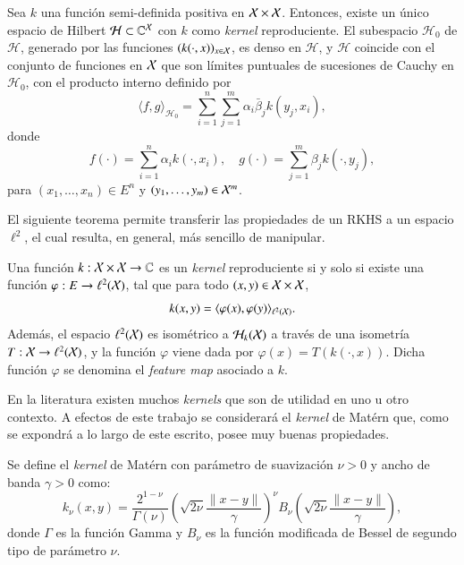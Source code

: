 \begin{teo}
Sea \( k \) una función semi-definida positiva en \( \mathcal{X} \times \mathcal{X} \). Entonces, existe un único espacio de Hilbert \( \mathcal{H} \subset \mathbb{C}^{\mathcal{X}} \) con \( k \) como \textit{kernel} reproduciente. El subespacio \( \mathcal{H}_0 \) de \( \mathcal{H} \), generado por las funciones \( (k(\cdot, x))_{x \in \mathcal{X}} \), es denso en \( \mathcal{H} \), y \( \mathcal{H} \) coincide con el conjunto de funciones en \( \mathcal{X} \) que son límites puntuales de sucesiones de Cauchy en \( \mathcal{H}_0 \), con el producto interno definido por
\[
\langle f, g \rangle_{\mathcal{H}_0} = \sum_{i=1}^n \sum_{j=1}^m \alpha_i \bar{\beta}_j k(y_j, x_i),
\]
donde
\[
f(\cdot) = \sum_{i=1}^n \alpha_i k(\cdot, x_i), \quad g(\cdot) = \sum_{j=1}^m \beta_j k(\cdot, y_j),
\]
para \( (x_1, \dots, x_n) \in E^n \) y \( (y_1, \dots, y_m) \in \mathcal{X}^m \).
\end{teo}

El siguiente teorema permite transferir las propiedades de un RKHS a un espacio \( \ell^2 \), el cual resulta, en general, más sencillo de manipular.

\begin{teo}
Una función \( k: \mathcal{X} \times \mathcal{X} \to \mathbb{C} \) es un \textit{kernel} reproduciente si y solo si existe una función \( \varphi: E \to \ell^2 (\mathcal{X}) \), tal que para todo \( (x, y) \in \mathcal{X} \times \mathcal{X} \),
\[
k(x, y)= \langle \varphi(x), \varphi(y) \rangle_{\ell^2(\mathcal{X})}.
\]
Además, el espacio \( \ell^2(\mathcal{X}) \) es isométrico a \( \mathcal{H}_k(\mathcal{X}) \) a través de una isometría \( T: \mathcal{X} \to \ell^2(\mathcal{X}) \), y la función \( \varphi \) viene dada por \( \varphi(x) = T(k(\cdot, x)) \). Dicha función \( \varphi \) se denomina el \textit{feature map} asociado a \( k \).
\end{teo}
En la literatura existen muchos \textit{kernels} que son de utilidad en uno u otro contexto. A efectos de este trabajo se considerará el \textit{kernel} de Matérn que, como se expondrá a lo largo de este escrito, posee muy buenas propiedades.
\begin{defn}
Se define el \textit{kernel} de Matérn con parámetro de suavización \( \nu > 0 \) y ancho de banda \( \gamma > 0 \) como:
\[
k_{\nu}(x,y) = \frac{2^{1-\nu}}{\Gamma(\nu)} \left( \sqrt{2\nu} \frac{\|x-y\|}{\gamma} \right)^\nu B_\nu \left( \sqrt{2\nu} \frac{\|x-y\|}{\gamma} \right),
\]
donde \( \Gamma \) es la función Gamma y \( B_\nu \) es la función modificada de Bessel de segundo tipo de parámetro \( \nu \).

\end{defn}

